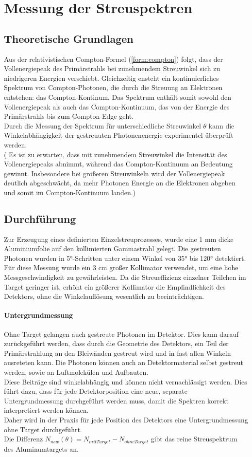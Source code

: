 \section{Messung der Streuspektren}
\subsection{Theoretische Grundlagen}
Aus der relativistischen Compton-Formel (\ref{form:compton}) folgt, dass der Vollenergiepeak des Primärstrahls bei zunehmendem Streuwinkel sich zu niedrigeren Energien verschiebt. Gleichzeitig ensteht ein kontinuierliches Spektrum von Compton-Photonen, die durch die Streuung an Elektronen entstehen: das Compton-Kontinum. Das Spektrum enthält somit sowohl den Vollenergiepeak als auch das Compton-Kontinuum, das von der Energie des Primärstrahls bis zum Compton-Edge geht.\\
Durch die Messung der Spektrum für unterschiedliche Streuwinkel $\theta$ kann die Winkelabhängigkeit der gestreuuten Photonenenergie experimentel überprüft werden.\\

( Es ist zu erwarten, dass mit zunehmendem Streuwinkel die Intensität des Vollenergiepeaks abnimmt, während das Compton-Kontinuum an Bedeutung gewinnt. Insbesondere bei größeren Streuwinkeln wird der Vollenergiepeak deutlich abgeschwächt, da mehr Photonen Energie an die Elektronen abgeben und somit im Compton-Kontinuum landen.)
\subsection{Durchführung}
Zur Erzeugung eines definierten Einzelstreuprozesses, wurde eine 1 mm dicke Aluminiumfolie auf den kollimierten Gammastrahl gelegt. Die gestreuten Photonen wurden in 5°-Schritten unter einem Winkel von 35° bis 120° detektiert. Für diese Messung wurde ein 3 cm großer Kollimator verwendet, um eine hohe Messgeschwindigkeit zu gewährleisten. Da die Streueffizienz einzelner Teilchen im Target geringer ist, erhöht ein größerer Kollimator die Empfindlichkeit des Detektors, ohne die Winkelauflösung wesentlich zu beeinträchtigen.
\paragraph{Untergrundmessung}
Ohne Target gelangen auch gestreute Photonen im Detektor. Dies kann darauf zurückgeführt werden, dass durch die Geometrie des Detektors, ein Teil der Primärstrahlung an den Bleiwänden gestreut wird und in fast allen Winkeln ausreteten kann. Die Photonen können auch an Detektormaterial selbst gestreut werden, sowie an Luftmolekülen und Aufbauten. \\
Diese Beiträge sind winkelabhängig und können nicht vernachlässigt werden. Dies führt dazu, dass für jede Detektorposition eine neue, separate Untergrundmessung durchgeführt werden muss, damit die Spektren korrekt interpretiert werden können. \\
Daher wird in der Praxis für jede Position des Detektors eine Untergrundmessung ohne Target durchgeführt.\\
Die Differenz $N_{new}(\theta)=N_{mit Target}-N_{ohne Target}$ gibt das reine Streuspektrum des Aluminumtargets an. 